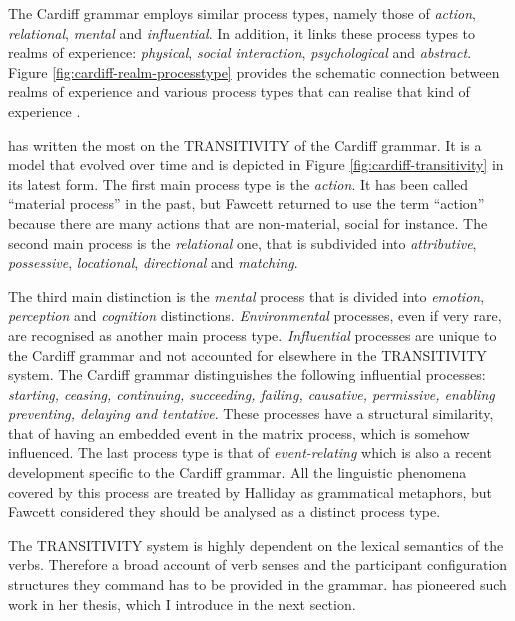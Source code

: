     The Cardiff grammar employs similar process types, namely those of \textit{action}, \textit{relational}, \textit{mental} and \textit{influential}. In addition, it links these process types to realms of experience: \textit{physical}, \textit{social interaction}, \textit{psychological} and \textit{abstract}. Figure \ref{fig:cardiff-realm-processtype} provides the schematic connection between realms of experience and various process types that can realise that kind of experience \citep[37]{Fawcett2009}. 

    \citet{Fawcett1973,Fawcett87-relational,Fawcett96} has written the most on the TRANSITIVITY of the Cardiff grammar. It is a model that evolved over time and is depicted in Figure \ref{fig:cardiff-transitivity} in its latest form. The first main process type is the \textit{action}. It has been called ``material process'' in the past, but Fawcett returned to use the term ``action'' because there are many actions that are non-material, social for instance. The second main process is the \textit{relational} one, that is subdivided into \textit{attributive}, \textit{possessive}, \textit{locational}, \textit{directional} and \textit{matching}.

    The third main distinction is the \textit{mental} process that is divided into \textit{emotion}, \textit{perception} and \textit{cognition} distinctions. \textit{Environmental} processes, even if very rare, are recognised as another main process type. \textit{Influential} processes are unique to the Cardiff grammar and not accounted for elsewhere in the TRANSITIVITY system. The Cardiff grammar distinguishes the following influential processes: \textit{starting, ceasing, continuing, succeeding, failing, causative, permissive, enabling preventing, delaying and tentative}. These processes have a structural similarity, that of having an embedded event in the matrix process, which is somehow influenced. The last process type is that of \textit{event-relating} which is also a recent development specific to the Cardiff grammar. All the linguistic phenomena covered by this process are treated by Halliday as grammatical metaphors, but Fawcett considered they should be analysed as a distinct process type.
    
    The TRANSITIVITY system is highly dependent on the lexical semantics of the verbs. Therefore a broad account of verb senses and the participant configuration structures they command has to be provided in the grammar. \citet{Neale2002} has pioneered such work in her thesis, which I introduce in the next section. 

